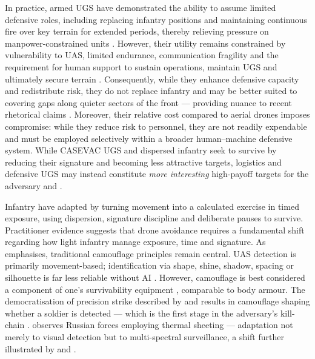{In practice, armed UGS have demonstrated the ability to assume limited defensive roles, including replacing infantry positions and maintaining continuous fire over key terrain for extended periods, thereby relieving pressure on manpower-constrained units \parencite{Militarnyi_Shumlianskyi_2025_11_15}. However, their utility remains constrained by vulnerability to UAS, limited endurance, communication fragility and the requirement for human support to sustain operations, maintain UGS and ultimately secure terrain \parencite{david_participant_2}. Consequently, while they enhance defensive capacity and redistribute risk, they do not replace infantry and may be better suited to covering gaps along quieter sectors of the front --- providing nuance to recent rhetorical claims \textcite{loh_rboto,tretii_armiiskyi_korpus_2025_12_22_ground_drone_holds_position}. Moreover, their relative cost compared to aerial drones imposes compromise: while they reduce risk to personnel, they are not readily expendable and must be employed selectively within a broader human--machine defensive system. While CASEVAC UGS and dispersed infantry seek to survive by reducing their signature and becoming less attractive targets, logistics and defensive UGS may instead constitute \textit{more interesting} high-payoff targets for the adversary \parencite{david_participant_2} and \parencite[40:00--42:00]{lyle_23_interview}.












Infantry have adapted by turning movement into a calculated exercise in timed exposure, using dispersion, signature discipline and deliberate pauses to survive. Practitioner evidence suggests that drone avoidance requires a fundamental shift regarding how light infantry manage exposure, time and signature. As \textcite{garand_thumb_CUAS_2026_3_15} emphasises, traditional camouflage principles remain central. UAS detection is primarily movement-based; identification via shape, shine, shadow, spacing or silhouette is far less reliable without AI \parencite[5:00--6:00]{civdiv_1}. However, camouflage is best considered a component of one's survivability equipment \parencite{Hall_2021_camouflage_platform}, comparable to body armour. The democratisation of precision strike described by \textcite{stu_lyle_participant_11} and \textcite[14]{hvizda_2025} results in camouflage shaping whether a soldier is detected --- which is the first stage in the adversary's kill-chain \parencite{Hemez_2017}. \textcite[3]{watling_2025_10} observes Russian forces employing thermal sheeting --- adaptation not merely to visual detection but to multi-spectral surveillance, a shift further illustrated by \textcite{ukrainian_navy_2025_12_7_camo} and \textcite{United24Media_camouflage_2026_2_28}.

}
